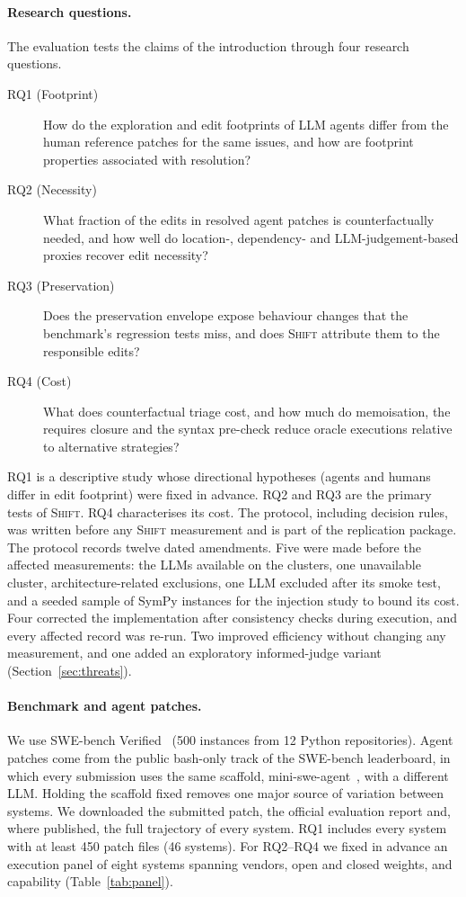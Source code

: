 \documentclass[a4paper,fleqn]{cas-sc}
\newcommand{\tool}{\textsc{Shift}}
\newcommand{\rqoneSystems}{46}
\begin{document}
\paragraph{Research questions.} The evaluation tests the claims of the introduction through four research questions.
\begin{description}
\item[RQ1 (Footprint)] How do the exploration and edit footprints of LLM agents differ from the human reference patches for the same issues, and how are footprint properties associated with resolution?
\item[RQ2 (Necessity)] What fraction of the edits in resolved agent patches is counterfactually needed, and how well do location-, dependency- and LLM-judgement-based proxies recover edit necessity?
\item[RQ3 (Preservation)] Does the preservation envelope expose behaviour changes that the benchmark's regression tests miss, and does \tool{} attribute them to the responsible edits?
\item[RQ4 (Cost)] What does counterfactual triage cost, and how much do memoisation, the requires closure and the syntax pre-check reduce oracle executions relative to alternative strategies?
\end{description}
RQ1 is a descriptive study whose directional hypotheses (agents and humans differ in edit footprint) were fixed in advance. RQ2 and RQ3 are the primary tests of \tool{}. RQ4 characterises its cost. The protocol, including decision rules, was written before any \tool{} measurement and is part of the replication package. The protocol records twelve dated amendments. Five were made before the affected measurements: the LLMs available on the clusters, one unavailable cluster, architecture-related exclusions, one LLM excluded after its smoke test, and a seeded sample of SymPy instances for the injection study to bound its cost. Four corrected the implementation after consistency checks during execution, and every affected record was re-run. Two improved efficiency without changing any measurement, and one added an exploratory informed-judge variant (Section~\ref{sec:threats}).

\paragraph{Benchmark and agent patches.} We use SWE-bench Verified~\citep{chowdhury2024verified} (500 instances from 12 Python repositories). Agent patches come from the public bash-only track of the SWE-bench leaderboard, in which every submission uses the same scaffold, mini-swe-agent~\citep{miniswe2025}, with a different LLM. Holding the scaffold fixed removes one major source of variation between systems. We downloaded the submitted patch, the official evaluation report and, where published, the full trajectory of every system. RQ1 includes every system with at least 450 patch files (\rqoneSystems{} systems). For RQ2--RQ4 we fixed in advance an execution panel of eight systems spanning vendors, open and closed weights, and capability (Table~\ref{tab:panel}).
\end{document}
